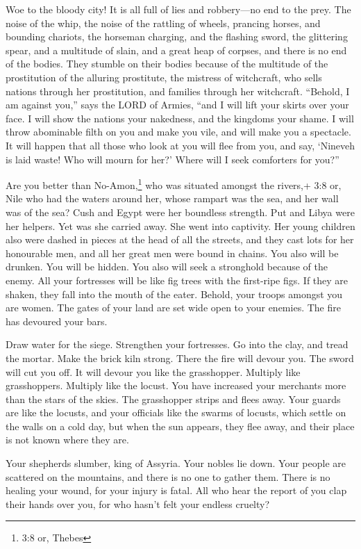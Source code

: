  Woe to the bloody city! It is all full of lies and
robbery---no end to the prey.  The noise of the whip, the
noise of the rattling of wheels, prancing horses, and bounding chariots,
 the horseman charging, and the flashing sword, the
glittering spear, and a multitude of slain, and a great heap of corpses,
and there is no end of the bodies. They stumble on their bodies
 because of the multitude of the prostitution of the
alluring prostitute, the mistress of witchcraft, who sells nations
through her prostitution, and families through her witchcraft.
 ``Behold, I am against you,'' says the LORD of Armies,
``and I will lift your skirts over your face. I will show the nations
your nakedness, and the kingdoms your shame.  I will throw
abominable filth on you and make you vile, and will make you a
spectacle.  It will happen that all those who look at you
will flee from you, and say, `Nineveh is laid waste! Who will mourn for
her?' Where will I seek comforters for you?''

 Are you better than No-Amon,\footnote{3:8 or, Thebes} who
was situated amongst the rivers,+ 3:8 or, Nile who had the waters around
her, whose rampart was the sea, and her wall was of the sea?
 Cush and Egypt were her boundless strength. Put and Libya
were her helpers.  Yet was she carried away. She went into
captivity. Her young children also were dashed in pieces at the head of
all the streets, and they cast lots for her honourable men, and all her
great men were bound in chains.  You also will be drunken.
You will be hidden. You also will seek a stronghold because of the
enemy.  All your fortresses will be like fig trees with the
first-ripe figs. If they are shaken, they fall into the mouth of the
eater.  Behold, your troops amongst you are women. The
gates of your land are set wide open to your enemies. The fire has
devoured your bars.

 Draw water for the siege. Strengthen your fortresses. Go
into the clay, and tread the mortar. Make the brick kiln strong.
 There the fire will devour you. The sword will cut you
off. It will devour you like the grasshopper. Multiply like
grasshoppers. Multiply like the locust.  You have increased
your merchants more than the stars of the skies. The grasshopper strips
and flees away.  Your guards are like the locusts, and your
officials like the swarms of locusts, which settle on the walls on a
cold day, but when the sun appears, they flee away, and their place is
not known where they are.

 Your shepherds slumber, king of Assyria. Your nobles lie
down. Your people are scattered on the mountains, and there is no one to
gather them.  There is no healing your wound, for your
injury is fatal. All who hear the report of you clap their hands over
you, for who hasn't felt your endless cruelty?
